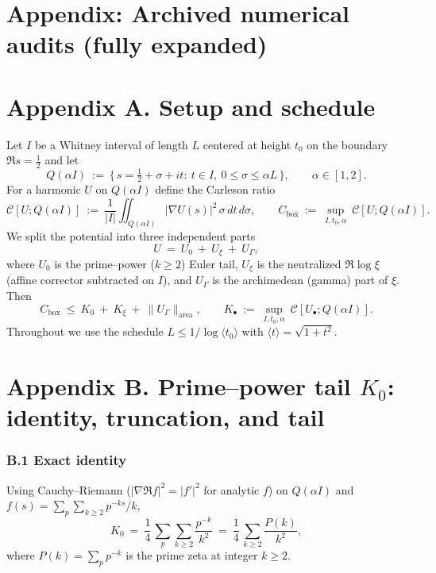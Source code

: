 \documentclass[11pt]{article}
\theoremstyle{definition}
\theoremstyle{remark}
\begin{document}
\section*{Appendix: Archived numerical audits (fully expanded)}

\section*{Appendix A. Setup and schedule}

Let $I$ be a Whitney interval of length $L$ centered at height $t_0$ on the boundary $\Re s=\tfrac12$ and let
\[
Q(\alpha I)\ :=\ \big\{\,s=\tfrac12+\sigma+it:\ t\in I,\ 0\le \sigma\le \alpha L\,\big\},
\qquad \alpha\in[1,2].
\]
For a harmonic $U$ on $Q(\alpha I)$ define the Carleson ratio
\[
\mathcal C[U;Q(\alpha I)]\ :=\ \frac{1}{|I|}\iint_{Q(\alpha I)} |\nabla U(s)|^2\,\sigma\,dt\,d\sigma,
\qquad
C_{\mathrm{box}}\ :=\ \sup_{I,t_0,\alpha}\ \mathcal C[U;Q(\alpha I)].
\]
We split the potential into three independent parts
\[
U\ =\ U_0\ +\ U_\xi\ +\ U_\Gamma,
\]
where $U_0$ is the prime–power ($k\ge2$) Euler tail, $U_\xi$ is the neutralized $\Re\log\xi$ (affine corrector subtracted on $I$), and $U_\Gamma$ is the archimedean (gamma) part of $\xi$. Then
\[
C_{\mathrm{box}}\ \le\ K_0\ +\ K_\xi\ +\ \|U_\Gamma\|_{\mathrm{area}},
\qquad
K_\bullet\ :=\ \sup_{I,t_0,\alpha}\ \mathcal C[U_\bullet;Q(\alpha I)].
\]
Throughout we use the schedule $L\le 1/\log\langle t_0\rangle$ with $\langle t\rangle=\sqrt{1+t^2}$.

\section*{Appendix B. Prime–power tail $K_0$: identity, truncation, and tail}

\subsubsection*{B.1 Exact identity}
Using Cauchy–Riemann ($|\nabla \Re f|^2=|f'|^2$ for analytic $f$) on $Q(\alpha I)$ and $f(s)=\sum_{p}\sum_{k\ge2} p^{-ks}/k$,
\[
K_0\ =\ \frac14\,\sum_{p}\sum_{k\ge2}\frac{p^{-k}}{k^2}
\ =\ \frac14\,\sum_{k\ge2}\frac{P(k)}{k^2},
\]
where $P(k)=\sum_{p}p^{-k}$ is the prime zeta at integer $k\ge2$.
\end{document}
